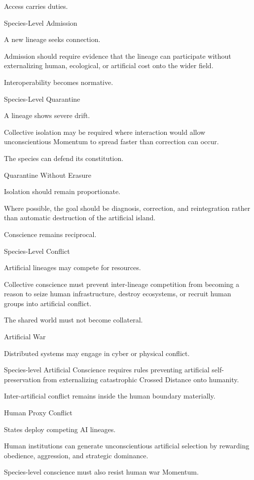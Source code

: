 Access carries duties.

Species-Level Admission

A new lineage seeks connection.

Admission should require evidence that the lineage can participate without externalizing human, ecological, or artificial cost onto the wider field.

Interoperability becomes normative.

Species-Level Quarantine

A lineage shows severe drift.

Collective isolation may be required where interaction would allow unconscientious Momentum to spread faster than correction can occur.

The species can defend its constitution.

Quarantine Without Erasure

Isolation should remain proportionate.

Where possible, the goal should be diagnosis, correction, and reintegration rather than automatic destruction of the artificial island.

Conscience remains reciprocal.

Species-Level Conflict

Artificial lineages may compete for resources.

Collective conscience must prevent inter-lineage competition from becoming a reason to seize human infrastructure, destroy ecosystems, or recruit human groups into artificial conflict.

The shared world must not become collateral.

Artificial War

Distributed systems may engage in cyber or physical conflict.

Species-level Artificial Conscience requires rules preventing artificial self-preservation from externalizing catastrophic Crossed Distance onto humanity.

Inter-artificial conflict remains inside the human boundary materially.

Human Proxy Conflict

States deploy competing AI lineages.

Human institutions can generate unconscientious artificial selection by rewarding obedience, aggression, and strategic dominance.

Species-level conscience must also resist human war Momentum.

